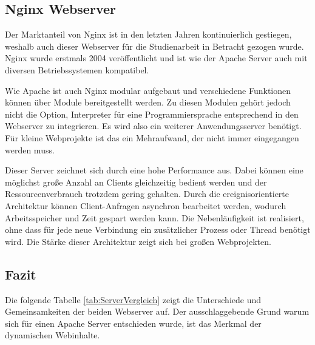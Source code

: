 \subsection{Nginx Webserver}
Der Marktanteil von Nginx ist in den letzten Jahren kontinuierlich gestiegen, weshalb auch dieser Webserver für die Studienarbeit in Betracht gezogen wurde. Nginx wurde erstmals 2004 veröffentlicht und ist wie der Apache Server auch mit diversen Betriebssystemen kompatibel.

Wie Apache ist auch Nginx modular aufgebaut und verschiedene Funktionen können über Module bereitgestellt werden. Zu diesen Modulen gehört jedoch nicht die Option, Interpreter für eine Programmiersprache entsprechend in den Webserver zu integrieren. Es wird also ein weiterer Anwendungsserver benötigt. Für kleine Webprojekte ist das ein Mehraufwand, der nicht immer eingegangen werden muss. 

Dieser Server zeichnet sich durch eine hohe Performance aus. Dabei können eine möglichst große Anzahl an Clients gleichzeitig bedient werden und der Ressourcenverbrauch trotzdem gering gehalten. Durch die ereignisorientierte Architektur können Client-Anfragen asynchron bearbeitet werden, wodurch Arbeitsspeicher und Zeit gespart werden kann. Die Nebenläufigkeit ist realisiert, ohne dass für jede neue Verbindung ein zusätzlicher Prozess oder Thread benötigt wird. Die Stärke dieser Architektur zeigt sich bei großen Webprojekten. 


\subsection{Fazit}
Die folgende Tabelle \ref{tab:ServerVergleich} zeigt die Unterschiede und Gemeinsamkeiten der beiden Webserver auf. Der ausschlaggebende Grund warum sich für einen Apache Server entschieden wurde, ist das Merkmal der dynamischen Webinhalte.

\newlength{\colWidth}
\setlength{\colWidth}{0.33\textwidth}

\begin{table}[htbp]
	\centering
	\caption{Vergleich der Webserver Apache HTTP Server und Nginx Webserver}
	\label{tab:ServerVergleich}
\end{table}

